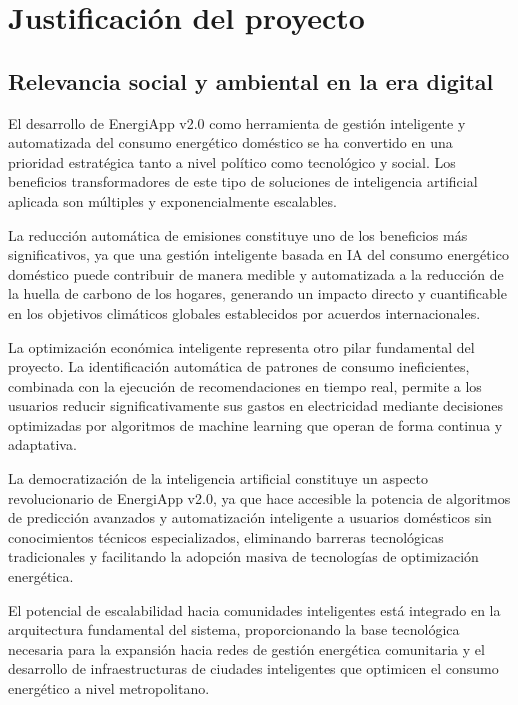 \section{Justificación del proyecto}

\subsection{Relevancia social y ambiental en la era digital}

El desarrollo de EnergiApp v2.0 como herramienta de gestión inteligente y automatizada del consumo energético doméstico se ha convertido en una prioridad estratégica tanto a nivel político como tecnológico y social. Los beneficios transformadores de este tipo de soluciones de inteligencia artificial aplicada son múltiples y exponencialmente escalables.

La reducción automática de emisiones constituye uno de los beneficios más significativos, ya que una gestión inteligente basada en IA del consumo energético doméstico puede contribuir de manera medible y automatizada a la reducción de la huella de carbono de los hogares, generando un impacto directo y cuantificable en los objetivos climáticos globales establecidos por acuerdos internacionales.

La optimización económica inteligente representa otro pilar fundamental del proyecto. La identificación automática de patrones de consumo ineficientes, combinada con la ejecución de recomendaciones en tiempo real, permite a los usuarios reducir significativamente sus gastos en electricidad mediante decisiones optimizadas por algoritmos de machine learning que operan de forma continua y adaptativa.

La democratización de la inteligencia artificial constituye un aspecto revolucionario de EnergiApp v2.0, ya que hace accesible la potencia de algoritmos de predicción avanzados y automatización inteligente a usuarios domésticos sin conocimientos técnicos especializados, eliminando barreras tecnológicas tradicionales y facilitando la adopción masiva de tecnologías de optimización energética.

El potencial de escalabilidad hacia comunidades inteligentes está integrado en la arquitectura fundamental del sistema, proporcionando la base tecnológica necesaria para la expansión hacia redes de gestión energética comunitaria y el desarrollo de infraestructuras de ciudades inteligentes que optimicen el consumo energético a nivel metropolitano.


